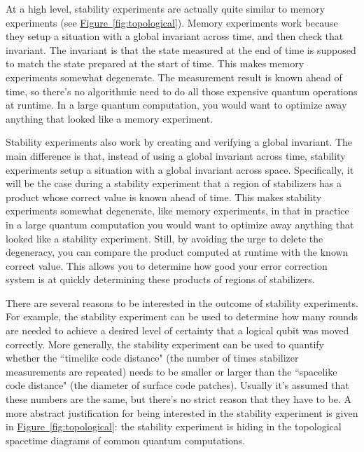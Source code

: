 \documentclass[onecolumn,unpublished,a4paper]{quantumarticle}
\theoremstyle{definition}
\theoremstyle{definition}
\theoremstyle{definition}
\newcommand{\fig}[1]{\hyperref[fig:#1]{Figure~\ref*{fig:#1}}}
\begin{document}
At a high level, stability experiments are actually quite similar to memory experiments (see \fig{topological}).
Memory experiments work because they setup a situation with a global invariant across time, and then check that invariant.
The invariant is that the state measured at the end of time is supposed to match the state prepared at the start of time.
This makes memory experiments somewhat degenerate.
The measurement result is known ahead of time, so there's no algorithmic need to do all those expensive quantum operations at runtime.
In a large quantum computation, you would want to optimize away anything that looked like a memory experiment.

Stability experiments also work by creating and verifying a global invariant.
The main difference is that, instead of using a global invariant across time, stability experiments setup a situation with a global invariant across space.
Specifically, it will be the case during a stability experiment that a region of stabilizers has a product whose correct value is known ahead of time.
This makes stability experiments somewhat degenerate, like memory experiments, in that in practice in a large quantum computation you would want to optimize away anything that looked like a stability experiment.
Still, by avoiding the urge to delete the degeneracy, you can compare the product computed at runtime with the known correct value.
This allows you to determine how good your error correction system is at quickly determining these products of regions of stabilizers.

There are several reasons to be interested in the outcome of stability experiments.
For example, the stability experiment can be used to determine how many rounds are needed to achieve a desired level of certainty that a logical qubit was moved correctly.
More generally, the stability experiment can be used to quantify whether the ``timelike code distance" (the number of times stabilizer measurements are repeated) needs to be smaller or larger than the ``spacelike code distance" (the diameter of surface code patches).
Usually it's assumed that these numbers are the same, but there's no strict reason that they have to be.
A more abstract justification for being interested in the stability experiment is given in \fig{topological}: the stability experiment is hiding in the topological spacetime diagrams of common quantum computations.
\end{document}
